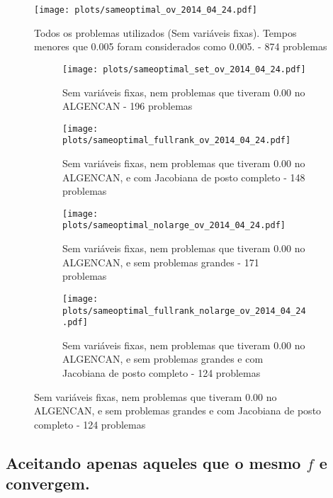 \documentclass{article}
\begin{document}
\begin{figure}[H]
  \centering
  \texttt{[image: plots/sameoptimal\_ov\_2014\_04\_24.pdf]}
  \caption{Todos os problemas utilizados (Sem variáveis fixas). Tempos menores
    que 0.005 foram considerados como 0.005. - 874 problemas}
\end{figure}
\begin{figure}[H]
  \centering
  \begin{subfigure}{0.48\textwidth}
    \texttt{[image: plots/sameoptimal\_set\_ov\_2014\_04\_24.pdf]}
    \caption{Sem variáveis fixas, nem problemas
      que tiveram 0.00 no ALGENCAN - 196 problemas}
  \end{subfigure}
  \begin{subfigure}{0.48\textwidth}
    \texttt{[image: plots/sameoptimal\_fullrank\_ov\_2014\_04\_24.pdf]}
    \caption{Sem variáveis fixas, nem problemas
      que tiveram 0.00 no ALGENCAN, e com Jacobiana de posto completo - 148
      problemas}
  \end{subfigure}
  \begin{subfigure}{0.48\textwidth}
    \texttt{[image: plots/sameoptimal\_nolarge\_ov\_2014\_04\_24.pdf]}
    \caption{Sem variáveis fixas, nem problemas
      que tiveram 0.00 no ALGENCAN, e sem problemas grandes - 171 problemas}
  \end{subfigure}
  \begin{subfigure}{0.48\textwidth}
    \texttt{[image: plots/sameoptimal\_fullrank\_nolarge\_ov\_2014\_04\_24.pdf]}
    \caption{Sem variáveis fixas, nem problemas
      que tiveram 0.00 no ALGENCAN, e sem problemas grandes e com Jacobiana de
      posto completo - 124 problemas}
  \end{subfigure}
\end{figure}

\subsection{Aceitando apenas aqueles que o mesmo $f$ e convergem. }
\end{document}
